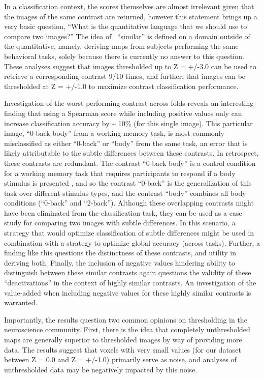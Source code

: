 \documentclass{report}
\begin{document}
In a classification context, the scores themselves are almost irrelevant
given that the images of the same contrast are returned, however this
statement brings up a very basic question, ``What is the quantitative
language that we should use to compare two images?'' The idea of
~``similar'' is defined on a domain outside of the quantitative, namely,
deriving maps from subjects performing the same behavioral tasks, solely
because there is currently no answer to this question. These analyses
suggest that images thresholded up to Z = +/-3.0 can be used to retrieve a
corresponding contrast 9/10 times, and further, that images can be
thresholded at Z = +/-1.0 to maximize contrast classification performance.

Investigation of the worst performing contrast across folds reveals an
interesting finding that using a Spearman score while including positive
values only can increase classification accuracy by \textasciitilde{} 10\% (for this single image). This particular image, ``0-back body''
from a working memory task, is most commonly misclassified as either
``0-back'' or ``body'' from the same task, an error that is likely
attributable to the subtle differences between these contrasts. In
retrospect, these contrasts are redundant. The contrast ``0-back body''
is a control condition for a working memory task that requires
participants to respond if a body stimulus is presented \cite{Brown2005-sb},
and so the contrast ``0-back'' is the generalization of this task over
different stimulus types, and the contrast ``body'' combines all body
conditions (``0-back'' and ``2-back''). Although these overlapping
contrasts might have been eliminated from the classification task, they
can be used as a case study for comparing two images with subtle
differences. In this scenario, a strategy that would optimize
classification of subtle differences might be used in combination with a
strategy to optimize global accuracy (across tasks). Further, a finding
like this questions the distinctness of these contrasts, and utility in
deriving both. Finally, the inclusion of negative values hindering
ability to distinguish between these similar contrasts again questions
the validity of these ``deactivations'' in the context of highly similar
contrasts. An investigation of the value-added when including negative
values for these highly similar contrasts is warranted.

Importantly, the results question two common opinions on thresholding in
the neuroscience community. First, there is the idea that completely
unthresholded maps are generally superior to thresholded images by way
of providing more data. The results suggest that voxels with very small
values (for our dataset between Z = 0.0 and Z = +/-1.0) primarily serve as
noise, and analyses of unthresholded data may be negatively impacted by
this noise.
\end{document}
